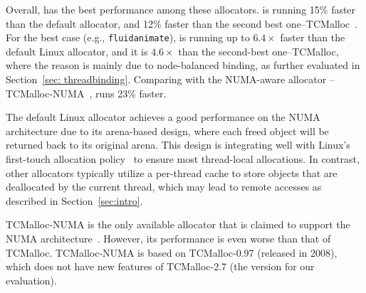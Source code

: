 Overall, \NM{} has the best performance among these allocators. \NM{} is running 15\% faster than the default allocator, and 12\% faster than the second best one--TCMalloc~\cite{tcmalloc}. For the best case (e.g., \texttt{fluidanimate}), \NM{} is running up to $6.4\times$ faster than the default Linux allocator, and it is $4.6\times$ than the second-best one--TCMalloc, where the reason is mainly due to node-balanced binding, as further evaluated in Section~\ref{sec: threadbinding}.  Comparing with the NUMA-aware allocator -- TCMalloc-NUMA~\cite{tcmallocnew}, \NM{} runs 23\% faster.

The default Linux allocator achieves a good performance on the NUMA architecture due to its arena-based design, where each freed object will be returned back to its original arena.
This design is integrating well with Linux's first-touch allocation policy~\cite{Lameter:2013:NO:2508834.2513149} to ensure most thread-local allocations. 
In contrast, other allocators typically utilize a per-thread cache to store objects that are deallocated by the current thread, which may lead to remote accesses as described in Section~\ref{sec:intro}. 

 TCMalloc-NUMA is the only available allocator that is claimed to support the NUMA architecture~\cite{tcmallocnew}. However, its performance is even worse than that of TCMalloc. TCMalloc-NUMA is based on TCMalloc-0.97 (released in 2008), which does not have new features of TCMalloc-2.7 (the version for our evaluation). 
 
  


